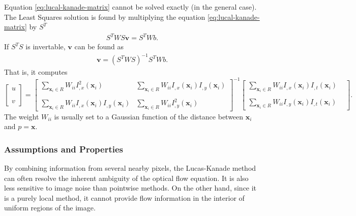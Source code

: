 \documentclass[letterpaper,12pt]{article}
\begin{document}
Equation \eqref{eq:lucal-kanade-matrix} cannot be solved exactly (in the general case). The Least Squares solution is found by multiplying the equation \eqref{eq:lucal-kanade-matrix} by $S^T$
\begin{align}
S^T W S \mathbf{v} = S^T W b.
\label{eq:lucas-kanade-leastsqaure}
\end{align} 
If $S^T S$ is invertable, $\mathbf{v}$ can be found as
\begin{align}
\mathbf{v} = (S^T W S)^{-1} S^T W b.
\label{eq:lucas-kanade-compact-solution}
\end{align}
That is, it computes
\begin{equation}
\begin{bmatrix}
u \\
~\\
\\
v
\end{bmatrix} = 
\begin{bmatrix}
\sum\limits_{\mathbf{x}_i \in R} W_{ii} I_{,x}^2(\mathbf{x}_i) &  \sum\limits_{\mathbf{x}_i \in R} W_{ii} I_{,x}(\mathbf{x}_i)I_{,y}(\mathbf{x}_i) \\ 
& \\
\sum\limits_{\mathbf{x}_i \in R} W_{ii} I_{,x}(\mathbf{x}_i)I_{,y}(\mathbf{x}_i) & \sum\limits_{\mathbf{x}_i \in R} W_{ii} I_{,y}^2(\mathbf{x}_i) 
\end{bmatrix}^{-1} \begin{bmatrix}
\sum\limits_{\mathbf{x}_i \in R} W_{ii} I_{,x}(\mathbf{x}_i) I_{,t}(\mathbf{x}_i) \\
& \\
\sum\limits_{\mathbf{x}_i \in R} W_{ii} I_{,y}(\mathbf{x}_i) I_{,t}(\mathbf{x}_i)
\end{bmatrix}.
\end{equation}
The weight $W_{ii}$ is usually set to a Gaussian function of the distance between $\mathbf{x}_i$ and $p=\mathbf{x}$.
\subsubsection*{Assumptions and Properties}
By combining information from several nearby pixels, the Lucas-Kanade method can often resolve the inherent ambiguity of the optical flow equation. It is also less sensitive to image noise than pointwise methods. On the other hand, since it is a purely local method, it cannot provide flow information in the interior of uniform regions of the image.
\end{document}
